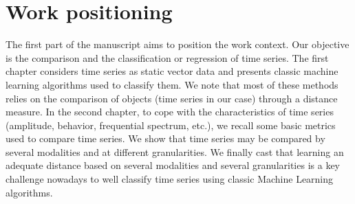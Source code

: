 \part{Work positioning}

The first part of the manuscript aims to position the work context. Our objective is the comparison and the classification or regression of time series. The first chapter considers time series as static vector data and presents classic machine learning algorithms used to classify them. We note that most of these methods relies on the comparison of objects (time series in our case) through a distance measure. In the second chapter, to cope with the characteristics of time series (amplitude, behavior, frequential spectrum, etc.), we recall some basic metrics used to compare time series. We show that time series may be compared by several modalities and at different granularities. We finally cast that learning an adequate distance based on several modalities and several granularities is a key challenge nowadays to well classify time series using classic Machine Learning algorithms.

